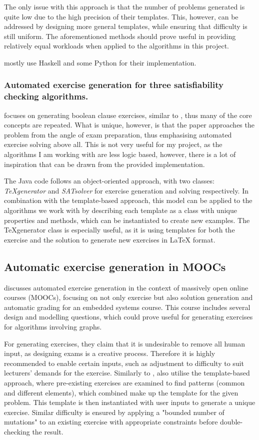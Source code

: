 \documentclass{l4proj}
\begin{document}
The only issue with this approach is that the number of problems generated is quite low due to the high precision of their templates. This, however, can be addressed by designing more general templates, while ensuring that difficulty is still uniform. The aforementioned methods should prove useful in providing relatively equal workloads when applied to the algorithms in this project. 

\citet{Hoz21} mostly use Haskell and some Python for their implementation.

\subsubsection{Automated exercise generation for three satisfiability checking algorithms.}

\citet{Esh22} focuses on generating boolean clause exercises, similar to \citet{Hoz21}, thus many of the core concepts are repeated. What is unique, however, is that the paper approaches the problem from the angle of exam preparation, thus emphasising automated exercise solving above all. This is not very useful for my project, as the algorithms I am working with are less logic based, however, there is a lot of inspiration that can be drawn from the provided implementation. 

The Java code follows an object-oriented approach, with two classes: \emph{TeXgenerator} and \emph{SATsolver} for exercise generation and solving respectively. In combination with the template-based approach, this model can be applied to the algorithms we work with by describing each template as a class with unique properties and methods, which can be instantiated to create new examples. The TeXgenerator class is especially useful, as it is using templates for both the exercise and the solution to generate new exercises in LaTeX format. 

\subsection{Automatic exercise generation in MOOCs}
\citet{Sad12} discusses automated exercise generation in the context of massively open online courses (MOOCs), focusing on not only exercise but also solution generation and automatic grading for an embedded systems course. This course includes several design and modelling questions, which could prove useful for generating exercises for algorithms involving graphs. 

For generating exercises, they claim that it is undesirable to remove all human input, as designing exams is a creative process. Therefore it is highly recommended to enable certain inputs, such as adjustment to difficulty to suit lecturers' demands for the exercise. Similarly to \citet{Hoz21}, \citet{Sad12} also utilise the template-based approach, where pre-existing exercises are examined to find patterns (common and different elements), which combined make up the template for the given problem. This template is then instantiated with user inputs to generate a unique exercise. Similar difficulty is ensured by applying a "bounded number of mutations" to an existing exercise with appropriate constraints before double-checking the result. 
\end{document}

